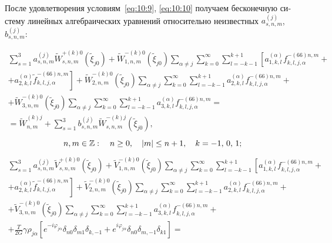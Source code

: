 \begin{russian}
После удовлетворения условиям~\eqref{eq:10:9}, \eqref{eq:10:10} получаем бесконечную систему линейных алгебраических уравнений относительно неизвестных $a_{s,n,m}^{(j)}$, $b_{s,n,m}^{(j)}$:

\begin{multline}
\sum\limits_{s = 1}^3 {a_{s,n,m}^{(j)}} \tilde W_{s,n,m}^{ + (k)0}({\tilde \xi _{j0}}) + \tilde W_{1,n,m}^{ - (k)0}({\tilde \xi _{j0}})\sum\limits_{\alpha  \ne j} {\sum\limits_{k = 0}^\infty  {\sum\limits_{l =  - k - 1}^{k + 1} {\left[ {a_{1,k,l}^{(\alpha )}f_{k,l,j,\alpha }^{ - (66)n,m} + } \right.} } } \\
\left. { + a_{2,k,l}^{(\alpha )}\tilde f_{k,l,j,\alpha }^{ - (66)n,m}} \right] + \tilde W_{2,n,m}^{ - (k)0}({\tilde \xi _{j0}})\sum\limits_{\alpha  \ne j} {\sum\limits_{k = 0}^\infty  {\sum\limits_{l =  - k - 1}^{k + 1} {a_{2,k,l}^{(\alpha )}} } f_{k,l,j,\alpha }^{ - (66)n,m} + } \\
+ \tilde W_{3,n,m}^{ - (k)0}({\tilde \xi _{j0}})\sum\limits_{\alpha  \ne j} {\sum\limits_{k = 0}^\infty  {\sum\limits_{l =  - k - 1}^{k + 1} {a_{3,k,l}^{(\alpha )}} } f_{k,l,j,\alpha }^{ - (66)n,m}}  = \\
= \tilde W_{n,m}^{(k)j} + \sum\limits_{s = 1}^3 {b_{s,n,m}^{(j)}} \tilde W_{s,n,m}^{ - (k)j}({\tilde \xi _{j0}}),
\end{multline}
$$
n,m \in\mathbb{Z}:\quad n \ge 0,\quad |m| \le n + 1,\quad k =  - 1,{\mkern 1mu} {\kern 1pt} 0,{\mkern 1mu} {\kern 1pt} 1;
$$
\begin{multline}
\sum\limits_{s = 1}^3 {a_{s,n,m}^{(j)}} \tilde V_{s,n,m}^{ + (k)0}({\tilde \xi _{j0}}) + \tilde V_{1,n,m}^{ - (k)0}({\tilde \xi _{j0}})\sum\limits_{\alpha  \ne j} {\sum\limits_{k = 0}^\infty  {\sum\limits_{l =  - k - 1}^{k + 1} {\left[ {a_{1,k,l}^{(\alpha )}f_{k,l,j,\alpha }^{ - (66)n,m} + } \right.} } } \\
\left. { + a_{2,k,l}^{(\alpha )}\tilde f_{k,l,j,\alpha }^{ - (66)n,m}} \right] + \tilde V_{2,n,m}^{ - (k)0}({\tilde \xi _{j0}})\sum\limits_{\alpha  \ne j} {\sum\limits_{k = 0}^\infty  {\sum\limits_{l =  - k - 1}^{k + 1} {a_{2,k,l}^{(\alpha )}} } f_{k,l,j,\alpha }^{ - (66)n,m} + } \\
+ \tilde V_{3,n,m}^{ - (k)0}({\tilde \xi _{j0}})\sum\limits_{\alpha  \ne j} {\sum\limits_{k = 0}^\infty  {\sum\limits_{l =  - k - 1}^{k + 1} {a_{3,k,l}^{(\alpha )}} } f_{k,l,j,\alpha }^{ - (66)n,m} + } \\
+ \frac{T}{{2G}}\gamma {\rho _{j\alpha }}\left[ {{e^{ - i{\varphi _{j\alpha }}}}{\delta _{n0}}{\delta _{m1}}{\delta _{k, - 1}} + {e^{i{\varphi _{j\alpha }}}}{\delta _{n0}}{\delta _{m, - 1}}{\delta _{k1}}} \right] = \\

\end{multline}
\end{russian}
